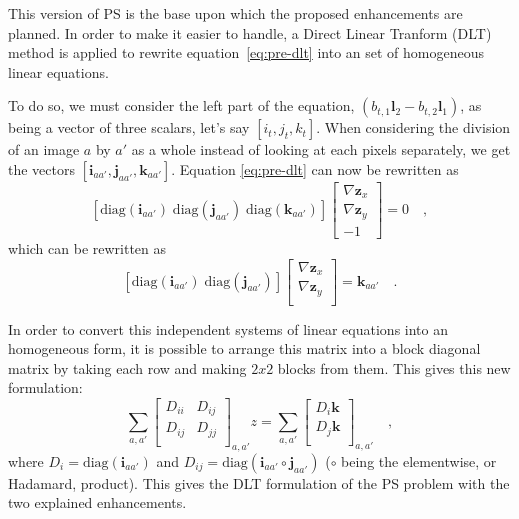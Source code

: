 This version of PS is the base upon which the proposed enhancements are planned. In order to make it easier to handle, a Direct Linear Tranform (DLT) method is applied to rewrite equation~\eqref{eq:pre-dlt} into an set of homogeneous linear equations.

To do so, we must consider the left part of the equation, $\left( b_{t,1} \mathbf{l}_2 - b_{t,2} \mathbf{l}_1 \right)$, as being a vector of three scalars, let's say $\left[ i_t, j_t, k_t \right]$. When considering the division of an image $a$ by $a'$ as a whole instead of looking at each pixels separately, we get the vectors $\left[ \mathbf{i}_{aa'}, \mathbf{j}_{aa'}, \mathbf{k}_{aa'} \right]$. Equation \eqref{eq:pre-dlt} can now be rewritten as
\begin{equation}
\left[ \mathrm{diag}(\mathbf{i}_{aa'}) \; \mathrm{diag}(\mathbf{j}_{aa'}) \; \mathrm{diag}(\mathbf{k}_{aa'})\right]
\begin{bmatrix}
\nabla \mathbf{z}_{x} \\
\nabla \mathbf{z}_{y} \\
-1
\end{bmatrix}
= 0 \quad,
\end{equation}
which can be rewritten as
\begin{equation}
\left[ \mathrm{diag}(\mathbf{i}_{aa'}) \; \mathrm{diag}(\mathbf{j}_{aa'}) \right]
\begin{bmatrix}
\nabla \mathbf{z}_{x} \\
\nabla \mathbf{z}_{y} \\
\end{bmatrix}
= \mathbf{k}_{aa'} \quad.
\end{equation}

In order to convert this independent systems of linear equations into an homogeneous form, it is possible to arrange this matrix into a block diagonal matrix by taking each row and making $2x2$ blocks from them.
This gives this new formulation:
\begin{equation}
\sum_{a,a'}
\begin{bmatrix}
D_{ii} & D_{ij} \\
D_{ij} & D_{jj} \\
\end{bmatrix}_{a,a'}
z =
\sum_{a,a'}
\begin{bmatrix}
D_i \mathbf{k} \\
D_j \mathbf{k} \\
\end{bmatrix}_{a,a'}
\quad,
\end{equation}
where $D_i = \mathrm{diag}(\mathbf{i}_{aa'})$ and $ D_{ij} = \mathrm{diag}\left(\mathbf{i}_{aa'} \circ \mathbf{j}_{aa'}\right)$ ($\circ$ being the elementwise, or Hadamard, product). This gives the DLT formulation of the PS problem with the two explained enhancements.

